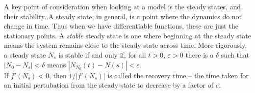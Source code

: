 \documentclass{tikzposter} %
\begin{document}
{    A key point of consideration when looking at a model is the steady states, and their stability. A steady state, in general, is a point where the dynamics do not change in time. Thus when we have differentiable functions, these are just the stationary points. A \emph{stable} steady state is one where beginning at the steady state means the system remains close to the steady state across time. More rigorously, a steady state $N_{s}$ is stable if and only if, for all $t > 0$, $\varepsilon > 0$ there is a $\delta$ such that $|N_{0} - N_{s}| < \delta$ means $|N_{N_{0}}(t)-N(s)| < \varepsilon$. \\

    If $f'(N_{s}) < 0$, then $1/|f'(N_{s})|$ is called the recovery time -- the time taken for an initial pertubation from the steady state to decrease by a factor of $e$. \\

}
\end{document}
